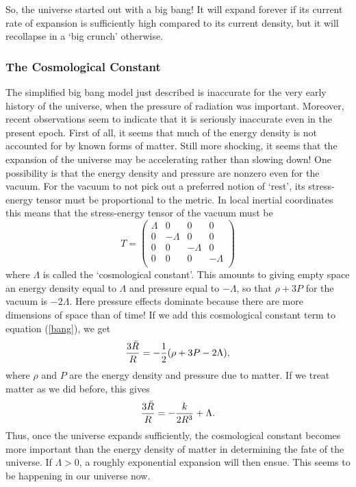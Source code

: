 \medskip
\centerline{\epsfysize=2.0in} \medskip

\noindent
So, the universe started out with a big bang!   It will
expand forever if its current rate of expansion is sufficiently
high compared to its current density, but it will recollapse in a 
`big crunch' otherwise.   

\subsubsection*{The Cosmological Constant}

The simplified big bang model just described is inaccurate for
the very early history of the universe, when the pressure of radiation
was important.  Moreover, recent observations seem to indicate that it is
seriously inaccurate even in the present epoch.  First of all, it seems
that much of the energy density is not accounted for by known forms of
matter.  Still more shocking, it seems that the expansion of the
universe may be accelerating rather than slowing down!  One possibility
is that the energy density and pressure are nonzero even for the vacuum.
For the vacuum to not pick out a preferred notion of `rest', its 
stress-energy tensor must be proportional to the metric.  In local
inertial coordinates this means that the stress-energy tensor
of the vacuum must be
\[ T = \left( \begin{array}{cccc} \Lambda & 0 &0& 0 \\ 
                                 0 & -\Lambda &0 & 0 \\
                                 0 & 0 &-\Lambda & 0 \\
                                 0 & 0 &0 & -\Lambda \\ 
\end{array}\right) \] 
where $\Lambda$ is called the `cosmological
constant'.  This amounts to giving empty space an energy density equal
to $\Lambda$ and pressure equal to $-\Lambda$, so that $\rho + 3P$ for
the vacuum is $-2\Lambda$.  Here pressure effects dominate because there are
more dimensions of space than of time!  If we add this cosmological
constant term to equation (\ref{bang}), we get 
\begin{equation}
{3\ddot R\over R} = -{1\over 2}(\rho + 3 P - 2\Lambda) ,
\label{lambdaequation}
\end{equation}
where $\rho$ and $P$ are the energy density and pressure due to matter.
If we treat matter as we did before, this gives
\[ {3\ddot R\over R} = -{k \over 2R^3} + \Lambda . \] 
Thus, once the universe expands sufficiently, the cosmological constant
becomes more important than the energy density of matter in
determining the fate of the universe.  If $\Lambda > 0$, 
a roughly exponential expansion will then ensue.  This seems
to be happening in our universe now.

